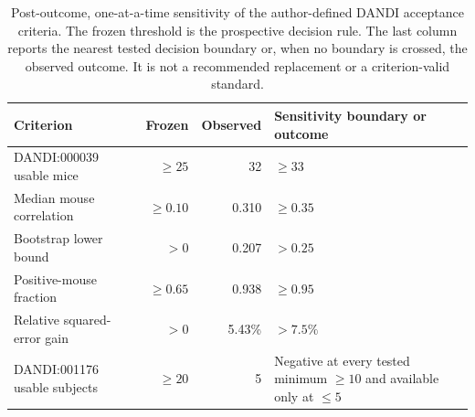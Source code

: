 \begin{table}[!htbp]
\centering
\caption{Post-outcome, one-at-a-time sensitivity of the author-defined DANDI acceptance criteria. The frozen threshold is the prospective decision rule. The last column reports the nearest tested decision boundary or, when no boundary is crossed, the observed outcome. It is not a recommended replacement or a criterion-valid standard.}
\label{tab:dandi-threshold-sensitivity}
\scriptsize
\renewcommand{\arraystretch}{1.02}
\begin{tabularx}{\textwidth}{@{}Y r r P{0.34\textwidth}@{}}
\toprule
Criterion & Frozen & Observed & Sensitivity boundary or outcome \\
\midrule
DANDI:000039 usable mice & $\geq25$ & 32 & $\geq33$ \\
Median mouse correlation & $\geq0.10$ & 0.310 & $\geq0.35$ \\
Bootstrap lower bound & $>0$ & 0.207 & $>0.25$ \\
Positive-mouse fraction & $\geq0.65$ & 0.938 & $\geq0.95$ \\
Relative squared-error gain & $>0$ & 5.43\% & $>7.5\%$ \\
DANDI:001176 usable subjects & $\geq20$ & 5 & Negative at every tested minimum $\geq10$ and available only at $\leq5$ \\
\bottomrule
\end{tabularx}
\end{table}
